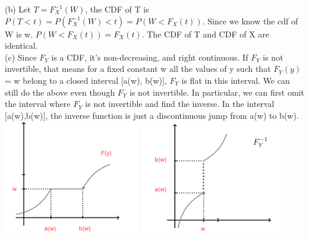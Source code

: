 \documentclass[12pt]{article}
\begin{document}
(b) Let $T = F^{-1}_X(W)$, the CDF of T is $P(T<t) = P(F^{-1}_X(W)<t)  = P(W<F_X(t))$. Since we know the cdf of W is w. $P(W<F_X(t)) = F_X(t)$. The CDF of T and CDF of X are identical.\\

(c)  Since $F_Y$ is a CDF, it's non-decreasing, and right continuous. If $F_Y$ is not invertible, that means for a fixed constant w all the values of y such that $F_Y (y)$ = w belong to a closed interval
[a(w), b(w)], $F_Y$ is flat in this interval. We can still do the above even though $F_Y$ is not invertible. In particular, we can first omit the interval where $F_Y$ is not invertible and find the inverse. In the interval [a(w),b(w)], the inverse function is just a discontinuous jump from a(w) to b(w).  \\

\includegraphics[height=2in]{p2}
\includegraphics[height=2in]{p3}
 


 
\end{document}

